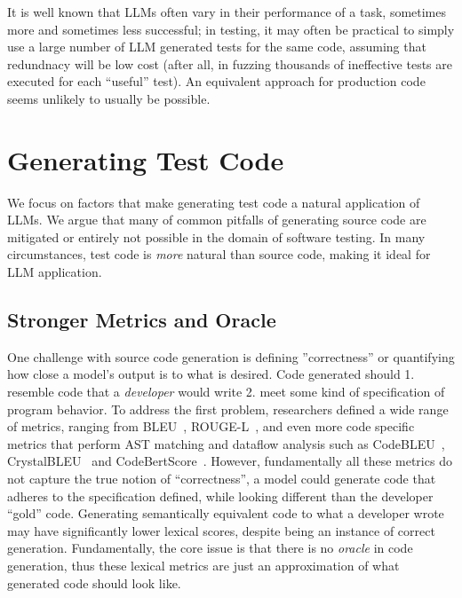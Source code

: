 \documentclass[sigconf,natbib=false]{acmart}
\begin{document}
It is well known that LLMs often vary in their performance of a task,
sometimes more and sometimes less successful; in testing, it may often
be practical to simply use a large number of LLM generated tests for
the same code, assuming that redundnacy will be low cost (after all,
in fuzzing thousands of ineffective tests are executed for each
``useful'' test).  An equivalent approach for production code seems
unlikely to usually be possible.

\section{Generating Test Code}

We focus on factors that make generating test code a natural application of 
LLMs. We argue that many of common pitfalls of generating source code are mitigated 
or entirely not possible in the domain of software testing. In many circumstances, test 
code is \emph{more} natural than source code, making it ideal for LLM application.

\subsection{Stronger Metrics and Oracle}

One challenge with source code generation is defining ''correctness'' or quantifying 
how close a model's output is to what is desired.  Code generated should 1. resemble code that a \emph{developer} would 
write 2. meet some kind of specification of program behavior. To address the first problem, researchers defined a wide 
range of metrics, ranging from BLEU~\cite{BLEU}, ROUGE-L~\cite{ROUGE}, and even more code specific metrics that perform 
AST matching and dataflow analysis such as CodeBLEU~\cite{CodeBLEU}, CrystalBLEU~\cite{CrystalBLEU} and CodeBertScore~\cite{CodeBERTScore}.
However, fundamentally all these metrics do not capture the true notion of ``correctness'', a model could generate code that adheres to the 
specification defined, while looking different than the developer ``gold'' code. Generating semantically equivalent code to what a developer wrote
may have significantly lower lexical scores, despite being an instance of correct generation. Fundamentally, the core issue is that there 
is no \emph{oracle} in code generation, thus these lexical metrics are just an approximation of what generated code should look like.
\end{document}
